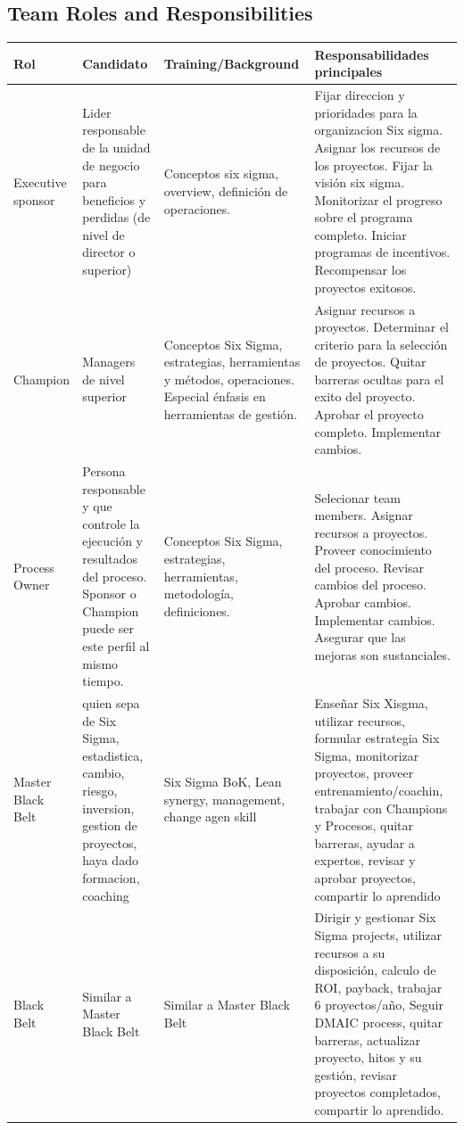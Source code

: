 \documentclass[]{article}
\begin{document}
\subsection{Team Roles and Responsibilities}

\begin{tabular}{p{1.5cm}|p{3cm}|p{4cm}|p{7cm}}
	\hline Rol & Candidato & Training/Background & Responsabilidades principales \\ 
	\hline Executive sponsor & Lider responsable de la unidad de negocio para beneficios y perdidas (de nivel de director o superior) & Conceptos six sigma, overview, definición de operaciones. & Fijar direccion y prioridades para la organizacion Six sigma. Asignar los recursos de los proyectos. Fijar la visión six sigma. Monitorizar el progreso sobre el programa completo. Iniciar programas de incentivos. Recompensar los proyectos exitosos.  \\ 
	\hline Champion & Managers de nivel superior & Conceptos Six Sigma, estrategias, herramientas y métodos, operaciones. Especial énfasis en herramientas de gestión. & Asignar recursos a proyectos. Determinar el criterio para la selección de proyectos. Quitar barreras ocultas para el exito del proyecto. Aprobar el proyecto completo. Implementar cambios. \\ 
	\hline Process Owner & Persona responsable y que controle la ejecución y resultados del proceso. Sponsor o Champion puede ser este perfil al mismo tiempo. & Conceptos Six Sigma, estrategias, herramientas, metodología, definiciones. & Selecionar team members. Asignar recursos a proyectos. Proveer conocimiento del proceso. Revisar cambios del proceso. Aprobar cambios. Implementar cambios. Asegurar que las mejoras son sustanciales. \\ 
	\hline Master Black Belt & quien sepa de Six Sigma, estadistica, cambio, riesgo, inversion, gestion de proyectos, haya dado formacion, coaching & Six Sigma BoK, Lean synergy, management, change agen skill & Enseñar Six Xisgma, utilizar recursos, formular estrategia Six Sigma, monitorizar proyectos, proveer entrenamiento/coachin, trabajar con Champions y Procesos, quitar barreras, ayudar a expertos, revisar y aprobar proyectos, compartir lo aprendido \\
	\hline Black Belt & Similar a Master Black Belt & Similar a Master Black Belt & Dirigir y gestionar Six Sigma projects, utilizar recursos a su disposición, calculo de ROI, payback, trabajar 6 proyectos/año, Seguir DMAIC process, quitar barreras, actualizar proyecto, hitos y su gestión, revisar proyectos completados, compartir lo aprendido.\\

\end{tabular}
\end{document}
